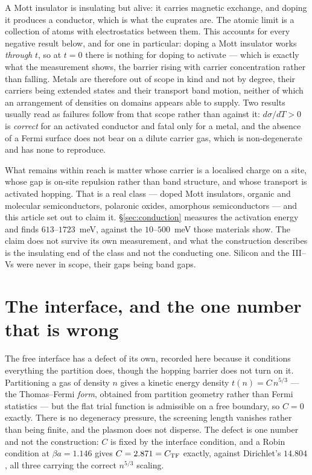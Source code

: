 \documentclass[11pt]{article}
\begin{document}
\noindent A Mott insulator is insulating but alive: it carries magnetic exchange, and doping it
produces a conductor, which is what the cuprates are. The atomic limit is a collection of atoms with
electrostatics between them. This accounts for every negative result below, and for one in
particular: doping a Mott insulator works \emph{through} $t$, so at $t=0$ there is nothing for
doping to activate --- which is exactly what the measurement shows, the barrier rising with carrier
concentration rather than falling. Metals are therefore out of scope in kind and not by degree, their carriers being extended states
and their transport band motion, neither of which an arrangement of densities on domains appears
able to supply. Two results usually read as failures follow from that scope rather than against it: $d\sigma/dT>0$ is \emph{correct} for an
activated conductor and fatal only for a metal, and the absence of a Fermi surface does not bear on
a dilute carrier gas, which is non-degenerate and has none to reproduce.

What remains within reach is matter whose carrier is a localised charge on a site, whose gap is
on-site repulsion rather than band structure, and whose transport is activated hopping. That is a
real class --- doped Mott insulators, organic and molecular semiconductors, polaronic oxides,
amorphous semiconductors --- and this article set out to claim it. \S\ref{sec:conduction} measures
the activation energy and finds $613$--$1723$~meV, against the $10$--$500$~meV those materials
show. The claim does not survive its own measurement, and what the construction describes is the
insulating end of the class and not the conducting one. Silicon and the III--Vs were never in
scope, their gaps being band gaps.

\section{The interface, and the one number that is wrong}\label{sec:coefficient}

The free interface has a defect of its own, recorded here because it conditions everything the
partition does, though the hopping barrier does not turn on it. Partitioning a gas of density $n$
gives a kinetic energy density $t(n)=C\,n^{5/3}$ --- the Thomas--Fermi \emph{form}, obtained from
partition geometry rather than Fermi statistics --- but the flat trial function is admissible on a
free boundary, so $C=0$ exactly. There is no degeneracy pressure, the screening length vanishes
rather than being finite, and the plasmon does not disperse. The defect is one number and not the
construction: $C$ is fixed by the interface condition, and a Robin condition at $\beta a=1.146$
gives $C=2.871=C_{\rm TF}$ exactly, against Dirichlet's $14.804$, all three carrying the correct
$n^{5/3}$ scaling.
\end{document}
